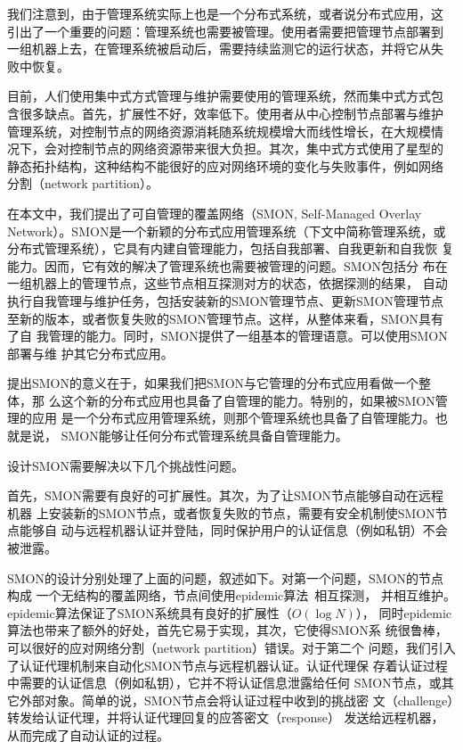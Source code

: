 我们注意到，由于管理系统实际上也是一个分布式系统，或者说分布式应用，这
引出了一个重要的问题：管理系统也需要被管理。使用者需要把管理节点部署到
一组机器上去，在管理系统被启动后，需要持续监测它的运行状态，并将它从失
败中恢复。%

目前，人们使用集中式方式管理与维护需要使用的管理系统，然而集中式方式包
含很多缺点。首先，扩展性不好，效率低下。使用者从中心控制节点部署与维护
管理系统，对控制节点的网络资源消耗随系统规模增大而线性增长，在大规模情
况下，会对控制节点的网络资源带来很大负担。其次，集中式方式使用了星型的
静态拓扑结构，这种结构不能很好的应对网络环境的变化与失败事件，例如网络
分割（network partition）。


在本文中，我们提出了可自管理的覆盖网络（SMON, Self-Managed Overlay
Network）。SMON是一个新颖的分布式应用管理系统（下文中简称管理系统，或
分布式管理系统），它具有内建自管理能力，包括自我部署、自我更新和自我恢
复能力。因而，它有效的解决了管理系统也需要被管理的问题。SMON包括分
布在一组机器上的管理节点，这些节点相互探测对方的状态，依据探测的结果，
自动执行自我管理与维护任务，包括安装新的SMON管理节点、更新SMON管理节点
至新的版本，或者恢复失败的SMON管理节点。这样，从整体来看，SMON具有了自
我管理的能力。同时，SMON提供了一组基本的管理语意。可以使用SMON部署与维
护其它分布式应用。

提出SMON的意义在于，如果我们把SMON与它管理的分布式应用看做一个整体，那
么这个新的分布式应用也具备了自管理的能力。特别的，如果被SMON管理的应用
是一个分布式应用管理系统，则那个管理系统也具备了自管理能力。也就是说，
SMON能够让任何分布式管理系统具备自管理能力。

设计SMON需要解决以下几个挑战性问题。

首先，SMON需要有良好的可扩展性。其次，为了让SMON节点能够自动在远程机器
上安装新的SMON节点，或者恢复失败的节点，需要有安全机制使SMON节点能够自
动与远程机器认证并登陆，同时保护用户的认证信息（例如私钥）不会被泄露。

SMON的设计分别处理了上面的问题，叙述如下。对第一个问题，SMON的节点构成
一个无结构的覆盖网络，节点间使用epidemic算法~\cite{Demers1987}相互探测，
并相互维护。epidemic算法保证了SMON系统具有良好的扩展性（$O(\log N)$），
同时epidemic算法也带来了额外的好处，首先它易于实现，其次，它使得SMON系
统很鲁棒，可以很好的应对网络分割（network partition）错误。对于第二个
问题，我们引入了认证代理机制来自动化SMON节点与远程机器认证。认证代理保
存着认证过程中需要的认证信息（例如私钥），它并不将认证信息泄露给任何
SMON节点，或其它外部对象。简单的说，SMON节点会将认证过程中收到的挑战密
文（challenge）转发给认证代理，并将认证代理回复的应答密文（response）
发送给远程机器，从而完成了自动认证的过程。

